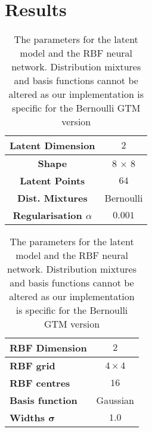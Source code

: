 \chapter{Results}




\begin{table}[H]
	\centering
	\begin{tabular}{|c|c|} \hline
		\textbf{Latent Dimension} & $2$ \\ \hline
		\textbf{Shape} & 8 $\times$ $8$ \\ \hline
		\textbf{Latent Points} &  $64$\\ \hline
		\textbf{Dist. Mixtures} &  Bernoulli\\ \hline \hline
		\textbf{Regularisation $\alpha$ } & $0.001$ \\ \hline
	\end{tabular}
	\hspace*{0.5cm}
	\begin{tabular}{|l|c|} \hline
		\textbf{RBF Dimension} & $2$ \\ \hline
		\textbf{RBF grid}  & $4\times4$ \\ \hline 
		\textbf{RBF centres} & $16$ \\ \hline
		\textbf{Basis function} & Gaussian \\ \hline
	    \textbf{Widths $\bm{\sigma}$} & $1.0$\\ \hline
	\end{tabular}
	\caption{The parameters for the latent model and the RBF neural network. Distribution mixtures and basis functions cannot be altered as our implementation is specific for the Bernoulli GTM version}
	\label{eval:model}
\end{table}




